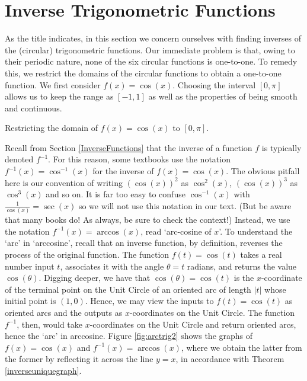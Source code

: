 \section{Inverse Trigonometric Functions}

\label{ArcTrig}

As the title indicates, in this section we concern ourselves with finding inverses of the (circular) trigonometric functions.  Our immediate problem is that, owing to their periodic nature, none of the six circular functions is  one-to-one. To remedy this, we restrict the domains of the circular functions to obtain a one-to-one function.  We first consider $f(x) = \cos(x)$. Choosing the interval $[0,\pi]$ allows us to keep the range as $[-1,1]$ as well as the properties of being smooth and continuous.

\medskip

\noindent\begin{minipage}{\textwidth}
\begin{center}
\end{center} 
\captionsetup{type=figure}
\caption{Restricting the domain of $f(x) = \cos(x)$ to $[0,\pi]$.}
\label{fig:arctrig1}
\end{minipage}

\medskip

Recall from Section \ref{InverseFunctions} that the inverse of a function $f$ is typically denoted $f^{-1}$.  For this reason, some textbooks use the notation $f^{-1}(x) = \cos^{-1}(x)$ for the inverse of $f(x) = \cos(x)$.  The obvious pitfall here is our convention of writing $(\cos(x))^2$ as $\cos^{2}(x)$, $(\cos(x))^3$ as $\cos^{3}(x)$ and so on.  It is far too easy to confuse $\cos^{-1}(x)$ with  $\frac{1}{\cos(x)} = \sec(x)$ so we will not use this notation in our text. (But be aware that many books do! As always, be sure to check the context!) Instead, we use the notation $f^{-1}(x) = \arccos(x)$, read `arc-cosine of $x$'.  To understand the `arc' in `arccosine', recall that an inverse function, by definition, reverses the process of the original function. The function $f(t) = \cos(t)$ takes a real number input $t$, associates it with the angle $\theta = t$ radians, and returns the value $\cos(\theta)$.  Digging deeper,  we have that $\cos(\theta) = \cos(t)$ is the $x$-coordinate of the terminal point on the Unit Circle of an oriented arc of length $|t|$ whose initial point is $(1, 0)$.  Hence, we may view the inputs to $f(t) = \cos(t)$ as oriented arcs and the outputs as $x$-coordinates on the Unit Circle.  The function $f^{-1}$, then, would take $x$-coordinates on the Unit Circle and return oriented arcs, hence the `arc' in arccosine. Figure \ref{fig:arctrig2} shows the graphs of $f(x) = \cos(x)$ and $f^{-1}(x) = \arccos(x)$, where we obtain the latter from the former by reflecting it across the line $y=x$, in accordance with Theorem \ref{inverseuniquegraph}. 

